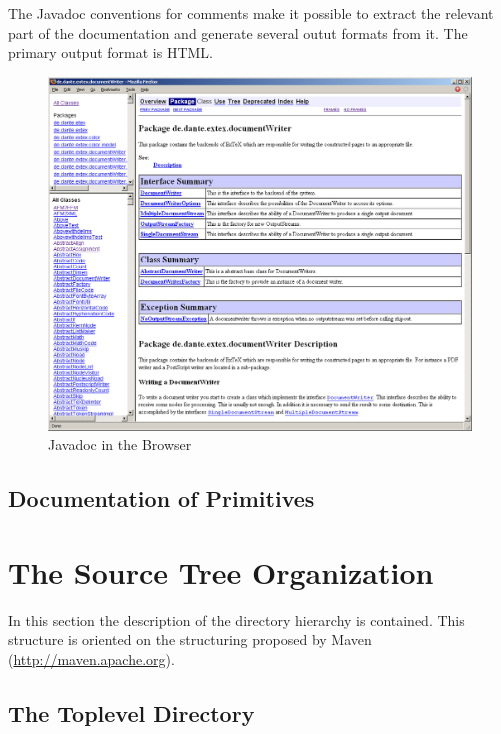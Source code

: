 \documentclass{extex-doc}
\begin{document}
The Javadoc conventions for comments make it possible to extract the
relevant part of the documentation and generate several outut formats
from it. The primary output format is HTML.
\begin{figure}[tbh]
  \centering
  \includegraphics[scale=.33]{image/javadoc}
  \caption{Javadoc in the Browser}\label{fig:eclipse-javadoc}
\end{figure}

\section{Documentation of Primitives}

\INCOMPLETE




\chapter{The Source Tree Organization}


In this section the description of the directory hierarchy is
contained. This structure is oriented on the structuring proposed by
Maven (\url{http://maven.apache.org}).


\section{The Toplevel Directory}
\end{document}
